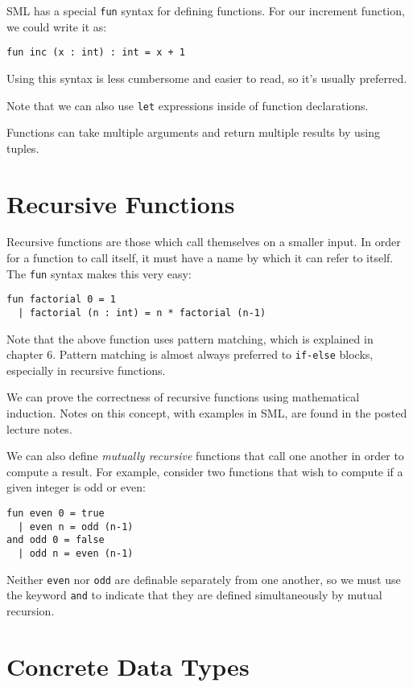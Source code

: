 \documentclass[11pt]{article}
\begin{document}
SML has a special \verb~fun~ syntax for defining functions. For our increment function, we could write it as:

\verb~fun inc (x : int) : int = x + 1~

Using this syntax is less cumbersome and easier to read, so it's usually preferred.

Note that we can also use \verb~let~ expressions inside of function declarations.

Functions can take multiple arguments and return multiple results by using tuples.

\section{Recursive Functions}

Recursive functions are those which call themselves on a smaller input. In order for a function to call itself, it must have a name by which it can refer to itself. The \verb~fun~ syntax makes this very easy:

\begin{verbatim}
fun factorial 0 = 1
  | factorial (n : int) = n * factorial (n-1)
\end{verbatim}

Note that the above function uses pattern matching, which is explained in chapter 6. Pattern matching is almost always preferred to \verb~if-else~ blocks, especially in recursive functions. 

We can prove the correctness of recursive functions using mathematical induction. Notes on this concept, with examples in SML, are found in the posted lecture notes.

We can also define \emph{mutually recursive} functions that call one another in order to compute a result. For example, consider two functions that wish to compute if a given integer is odd or even:

\begin{verbatim}
fun even 0 = true
  | even n = odd (n-1)
and odd 0 = false
  | odd n = even (n-1)
\end{verbatim}

Neither \verb~even~ nor \verb~odd~ are definable separately from one another, so we must use the keyword \verb~and~ to indicate that they are defined simultaneously by mutual recursion.

\section{Concrete Data Types}
\end{document}
